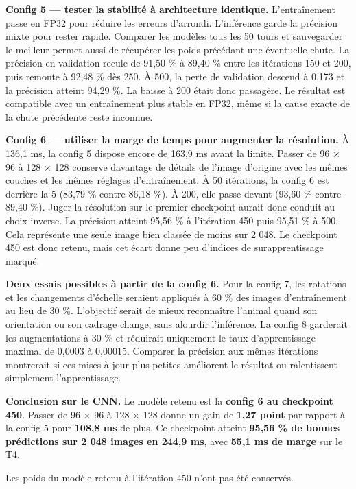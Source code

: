 \documentclass[10pt,a4paper]{article}
\begin{document}
\textbf{Config 5 — tester la stabilité à architecture identique.} L’entraînement passe en FP32 pour réduire les erreurs d’arrondi. L’inférence garde la précision mixte pour rester rapide. Comparer les modèles tous les 50 tours et sauvegarder le meilleur permet aussi de récupérer les poids précédant une éventuelle chute. La précision en validation recule de 91,50 \% à 89,40 \% entre les itérations 150 et 200, puis remonte à 92,48 \% dès 250. À 500, la perte de validation descend à 0,173 et la précision atteint 94,29 \%. La baisse à 200 était donc passagère. Le résultat est compatible avec un entraînement plus stable en FP32, même si la cause exacte de la chute précédente reste inconnue.

\textbf{Config 6 — utiliser la marge de temps pour augmenter la résolution.} À 136,1 ms, la config 5 dispose encore de 163,9 ms avant la limite. Passer de 96 × 96 à 128 × 128 conserve davantage de détails de l’image d’origine avec les mêmes couches et les mêmes réglages d’entraînement. À 50 itérations, la config 6 est derrière la 5 (83,79 \% contre 86,18 \%). À 200, elle passe devant (93,60 \% contre 89,40 \%). Juger la résolution sur le premier checkpoint aurait donc conduit au choix inverse. La précision atteint 95,56 \% à l’itération 450 puis 95,51 \% à 500. Cela représente une seule image bien classée de moins sur 2 048. Le checkpoint 450 est donc retenu, mais cet écart donne peu d’indices de surapprentissage marqué.

\textbf{Deux essais possibles à partir de la config 6.} Pour la config 7, les rotations et les changements d’échelle seraient appliqués à 60 \% des images d’entraînement au lieu de 30 \%. L’objectif serait de mieux reconnaître l’animal quand son orientation ou son cadrage change, sans alourdir l’inférence. La config 8 garderait les augmentations à 30 \% et réduirait uniquement le taux d’apprentissage maximal de 0,0003 à 0,00015. Comparer la précision aux mêmes itérations montrerait si ces mises à jour plus petites améliorent le résultat ou ralentissent simplement l’apprentissage.

\textbf{Conclusion sur le CNN.} Le modèle retenu est la \textbf{config 6 au checkpoint 450}. Passer de 96 × 96 à 128 × 128 donne un gain de \textbf{1,27 point} par rapport à la config 5 pour \textbf{108,8 ms} de plus. Ce checkpoint atteint \textbf{95,56 \% de bonnes prédictions sur 2 048 images en 244,9 ms}, avec \textbf{55,1 ms de marge} sur le T4.

Les poids du modèle retenu à l’itération 450 n’ont pas été conservés.
\end{document}
